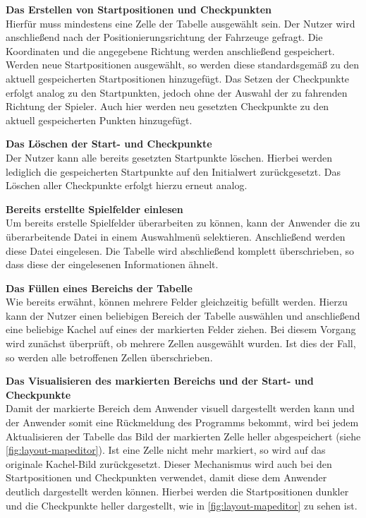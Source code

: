 \textbf{Das Erstellen von Startpositionen und Checkpunkten}\\
Hierfür muss mindestens eine Zelle der Tabelle ausgewählt sein. Der Nutzer wird anschließend nach der Positionierungsrichtung der Fahrzeuge gefragt. Die Koordinaten und die angegebene Richtung werden anschließend gespeichert. Werden neue Startpositionen ausgewählt, so werden diese standardsgemäß zu den aktuell gespeicherten Startpositionen hinzugefügt. Das Setzen der Checkpunkte erfolgt analog zu den Startpunkten, jedoch ohne der Auswahl der zu fahrenden Richtung der Spieler. Auch hier werden neu gesetzten Checkpunkte zu den aktuell gespeicherten Punkten hinzugefügt.

\textbf{Das Löschen der Start- und Checkpunkte}\\
Der Nutzer kann alle bereits gesetzten Startpunkte löschen. Hierbei werden lediglich die gespeicherten Startpunkte auf den Initialwert zurückgesetzt. Das Löschen aller Checkpunkte erfolgt hierzu erneut analog.

\textbf{Bereits erstellte Spielfelder einlesen}\\
Um bereits erstelle Spielfelder überarbeiten zu können, kann der Anwender die zu überarbeitende Datei in einem Auswahlmenü selektieren. Anschließend werden diese Datei eingelesen. Die Tabelle wird abschließend komplett überschrieben, so dass diese der eingelesenen Informationen ähnelt.

\textbf{Das Füllen eines Bereichs der Tabelle}\\
Wie bereits erwähnt, können mehrere Felder gleichzeitig befüllt werden. Hierzu kann der Nutzer einen beliebigen Bereich der Tabelle auswählen und anschließend eine beliebige Kachel auf eines der markierten Felder ziehen. Bei diesem Vorgang wird zunächst überprüft, ob mehrere Zellen ausgewählt wurden. Ist dies der Fall, so werden alle betroffenen Zellen überschrieben.

\textbf{Das Visualisieren des markierten Bereichs und der Start- und Checkpunkte}\\
Damit der markierte Bereich dem Anwender visuell dargestellt werden kann und der Anwender somit eine Rückmeldung des Programms bekommt, wird bei jedem Aktualisieren der Tabelle das Bild der markierten Zelle heller abgespeichert (siehe \autoref{fig:layout-mapeditor}). Ist eine Zelle nicht mehr markiert, so wird auf das originale Kachel-Bild zurückgesetzt. Dieser Mechanismus wird auch bei den Startpositionen und Checkpunkten verwendet, damit diese dem Anwender deutlich dargestellt werden können. Hierbei werden die Startpositionen dunkler und die Checkpunkte heller dargestellt, wie in \autoref{fig:layout-mapeditor} zu sehen ist.

